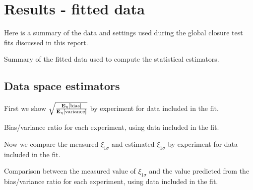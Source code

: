 \section{Results - fitted data}
\label{sec:ResultsFitted}

Here is a summary of the data and settings used during the global closure test
fits discussed in this report.

\begin{table}[h!]
    \label{tab:dataset_summary}
    
    \caption{Summary of the fitted data used to compute the statistical estimators.}
\end{table}

\FloatBarrier

\subsection{Data space estimators}

First we show $\sqrt{\frac{\mathbf{E}_{\eta}\left[ {\rm bias} \right]}{\mathbf{E}_{\eta}\left[ {\rm variance} \right]}}$ by experiment
for data included in the fit.

\begin{table}[h!]
    \label{tab:fitted_sqrt_ratio}
    
    \caption{Bias/variance ratio for each experiment, using data included in the fit.}
\end{table}

\FloatBarrier

Now we compare the measured $\xi_{1\sigma}$ and estimated $\xi_{1\sigma}$ by experiment
for data included in the fit.

\begin{table}[h!]
    \label{tab:fitted_xicomp}
    
    \caption{Comparison between the measured value of $\xi_{1\sigma}$ and the value predicted from the bias/variance ratio for each experiment, using data included in the fit.}
\end{table}
